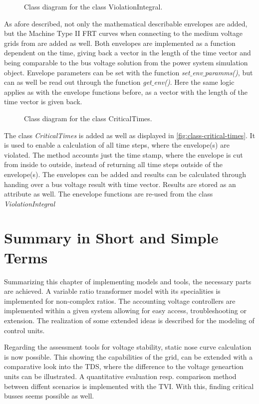 \begin{figure}[htbp!]
        \centering
        \caption[Class diagram for the class ViolationIntegral]{Class diagram for the class ViolationIntegral.}
        \label{fig:class-violation-integral}
\end{figure}

As afore described, not only the mathematical describable envelopes are added, but the Machine Type II \acs{FRT} curves when connecting to the medium voltage grids from \autocite{vde-tar_2018,vde-tar_2023} are added as well.
Both envelopes are implemented as a function dependent on the time, giving back a vector in the length of the time vector and being comparable to the bus voltage solution from the power system simulation object.
Envelope parameters can be set with the function \textit{set$\_$env$\_$paramms()}, but can as well be read out through the function \textit{get$\_$env()}.
Here the same logic applies as with the envelope functions before, as a vector with the length of the time vector is given back.

\begin{figure}[htbp!]
        \centering
        \caption[Class diagram for the class CriticalTimes]{Class diagram for the class CriticalTimes.}
        \label{fig:class-critical-times}
\end{figure}

The class \textit{CriticalTimes} is added as well as displayed in \autoref{fig:class-critical-times}.
It is used to enable a calculation of all time steps, where the envelope(s) are violated.
The method accounts just the time stamp, where the envelope is cut from inside to outside, instead of returning all time steps outside of the envelope(s).
The envelopes can be added and results can be calculated through handing over a bus voltage result with time vector.
Results are stored as an attribute as well.
The enevelope functions are re-used from the class \textit{ViolationIntegral}

\section{Summary in Short and Simple Terms}

Summarizing this chapter of implementing models and tools, the necessary parts are achieved.
A variable ratio transformer model with its specialities is implemented for non-complex ratios.
The accounting voltage controllers are implemented within a given system allowing for easy access, troubleshooting or extension.
The realization of some extended ideas is described for the modeling of control units.

Regarding the assessment tools for voltage stability, static nose curve calculation is now possible.
This showing the capabilities of the grid, can be extended with a comparative look into the \acs{TDS}, where the difference to the voltage geneartion units can be illustrated.
A quantitative evaluation resp. comparison method between diffent scenarios is implemented with the \acf{TVI}.
With this, finding critical busses seems possible as well.